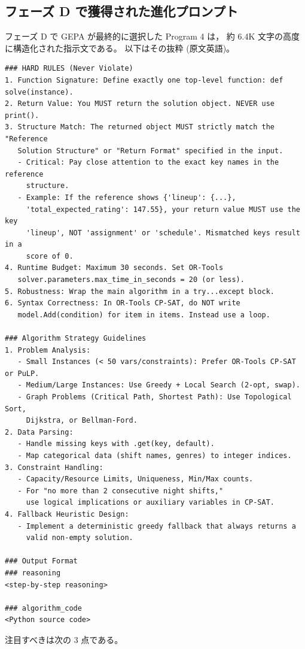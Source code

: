 \documentclass[uplatex,dvipdfmx,a4paper,11pt]{jsarticle}
\begin{document}
\subsection{フェーズ D で獲得された進化プロンプト}

フェーズ D で GEPA が最終的に選択した Program 4 は，
約 6.4K 文字の高度に構造化された指示文である。
以下はその抜粋 (原文英語)。

\begin{lstlisting}[language={}]
### HARD RULES (Never Violate)
1. Function Signature: Define exactly one top-level function: def solve(instance).
2. Return Value: You MUST return the solution object. NEVER use print().
3. Structure Match: The returned object MUST strictly match the "Reference
   Solution Structure" or "Return Format" specified in the input.
   - Critical: Pay close attention to the exact key names in the reference
     structure.
   - Example: If the reference shows {'lineup': {...},
     'total_expected_rating': 147.55}, your return value MUST use the key
     'lineup', NOT 'assignment' or 'schedule'. Mismatched keys result in a
     score of 0.
4. Runtime Budget: Maximum 30 seconds. Set OR-Tools
   solver.parameters.max_time_in_seconds = 20 (or less).
5. Robustness: Wrap the main algorithm in a try...except block.
6. Syntax Correctness: In OR-Tools CP-SAT, do NOT write
   model.Add(condition) for item in items. Instead use a loop.

### Algorithm Strategy Guidelines
1. Problem Analysis:
   - Small Instances (< 50 vars/constraints): Prefer OR-Tools CP-SAT or PuLP.
   - Medium/Large Instances: Use Greedy + Local Search (2-opt, swap).
   - Graph Problems (Critical Path, Shortest Path): Use Topological Sort,
     Dijkstra, or Bellman-Ford.
2. Data Parsing:
   - Handle missing keys with .get(key, default).
   - Map categorical data (shift names, genres) to integer indices.
3. Constraint Handling:
   - Capacity/Resource Limits, Uniqueness, Min/Max counts.
   - For "no more than 2 consecutive night shifts,"
     use logical implications or auxiliary variables in CP-SAT.
4. Fallback Heuristic Design:
   - Implement a deterministic greedy fallback that always returns a
     valid non-empty solution.

### Output Format
### reasoning
<step-by-step reasoning>

### algorithm_code
<Python source code>
\end{lstlisting}

注目すべきは次の 3 点である。
\end{document}
